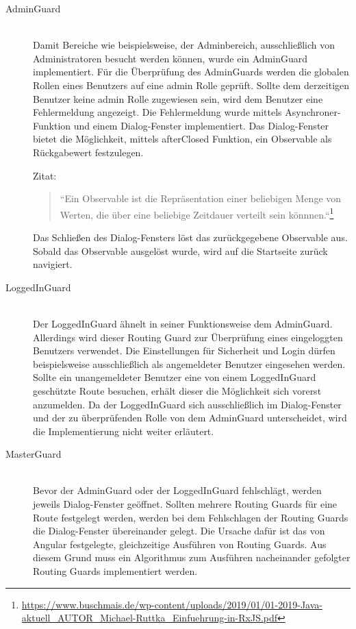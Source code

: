 \begin{description}
	\item[AdminGuard]\hfill\\
	Damit Bereiche wie beispielsweise, der Adminbereich, ausschlie{\ss}lich von Administratoren besucht werden können, wurde ein AdminGuard implementiert. Für die Überprüfung des AdminGuards werden die globalen Rollen eines Benutzers auf eine admin Rolle geprüft. Sollte dem derzeitigen Benutzer keine admin Rolle zugewiesen sein, wird dem Benutzer eine Fehlermeldung angezeigt. Die Fehlermeldung wurde mittels Asynchroner-Funktion und einem Dialog-Fenster implementiert. Das Dialog-Fenster bietet die Möglichkeit, mittels afterClosed Funktion, ein Observable als Rückgabewert festzulegen.
	
	Zitat:
	 \begin{quote}
		``Ein Observable ist die Repräsentation einer beliebigen Menge von Werten, die über eine beliebige Zeitdauer verteilt sein könnnen.``\footnote{\url{https://www.buschmais.de/wp-content/uploads/2019/01/01-2019-Java-aktuell_AUTOR_Michael-Ruttka_Einfuehrung-in-RxJS.pdf}}
	\end{quote}

	Das Schlie{\ss}en des Dialog-Fensters löst das zurückgegebene Observable aus. Sobald das Observable ausgelöst wurde, wird auf die Startseite zurück navigiert.
	
	\item[LoggedInGuard]\hfill\\
	Der LoggedInGuard ähnelt in seiner Funktionsweise dem AdminGuard. Allerdings wird dieser Routing Guard zur Überprüfung eines eingeloggten Benutzers verwendet. Die Einstellungen für Sicherheit und Login dürfen beispielsweise ausschlie{\ss}lich als angemeldeter Benutzer eingesehen werden. Sollte ein unangemeldeter Benutzer eine von einem LoggedInGuard geschützte Route besuchen, erhält dieser die Möglichkeit sich vorerst anzumelden. Da der LoggedInGuard sich ausschlie{\ss}lich im Dialog-Fenster und der zu überprüfenden Rolle von dem AdminGuard unterscheidet, wird die Implementierung nicht weiter erläutert.
	
	\item[MasterGuard]\hfill\\
	Bevor der AdminGuard oder der LoggedInGuard fehlschlägt, werden jeweils Dialog-Fenster geöffnet. Sollten mehrere Routing Guards für eine Route festgelegt werden, werden bei dem Fehlschlagen der Routing Guards die Dialog-Fenster übereinander gelegt. Die Ursache dafür ist das von Angular festgelegte, gleichzeitige Ausführen von Routing Guards. Aus diesem Grund muss ein Algorithmus zum Ausführen nacheinander gefolgter Routing Guards implementiert werden. 
	

\end{description}
